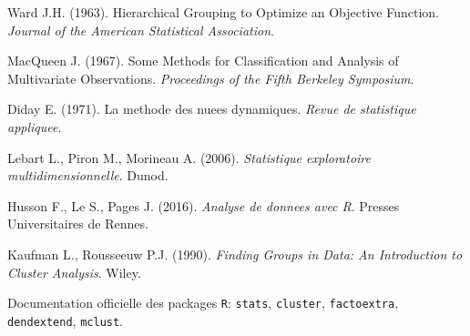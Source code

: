 \documentclass[12pt,a4paper]{book}
\newcommand{\R}{\texttt{R}}
\begin{document}
	\begin{enumerate}[leftmargin=*, label={[\arabic*]}]
		\item Ward J.H. (1963). Hierarchical Grouping to Optimize an Objective Function. \textit{Journal of the American Statistical Association}.
		\item MacQueen J. (1967). Some Methods for Classification and Analysis of Multivariate Observations. \textit{Proceedings of the Fifth Berkeley Symposium}.
		\item Diday E. (1971). La methode des nuees dynamiques. \textit{Revue de statistique appliquee}.
		\item Lebart L., Piron M., Morineau A. (2006). \textit{Statistique exploratoire multidimensionnelle}. Dunod.
		\item Husson F., Le S., Pages J. (2016). \textit{Analyse de donnees avec R}. Presses Universitaires de Rennes.
		\item Kaufman L., Rousseeuw P.J. (1990). \textit{Finding Groups in Data: An Introduction to Cluster Analysis}. Wiley.
		\item Documentation officielle des packages \R : \texttt{stats}, \texttt{cluster}, \texttt{factoextra}, \texttt{dendextend}, \texttt{mclust}.
	\end{enumerate}
	
\end{document}
